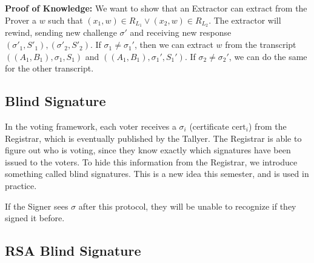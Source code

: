 \textbf{Proof of Knowledge:} We want to show that an Extractor can extract from the Prover a $w$ such that $(x_1, w) \in R_{L_1} \vee (x_2, w) \in R_{L_2}$. The extractor will rewind, sending new challenge $\sigma'$ and receiving new response $(\sigma'_1, S'_1), (\sigma'_2, S'_2)$. If $\sigma_1 \neq \sigma_1'$, then we can extract $w$ from the transcript $((A_1, B_1), \sigma_1, S_1)$ and $((A_1, B_1), \sigma_1', S_1')$. If $\sigma_2 \neq \sigma_2'$, we can do the same for the other transcript.

\subsection{Blind Signature}

In the voting framework, each voter receives a $\sigma_i$ (certificate $\text{cert}_i$) from the Registrar, which is eventually published by the Tallyer. The Registrar is able to figure out who is voting, since they know exactly which signatures have been issued to the voters. To hide this information from the Registrar, we introduce something called blind signatures. This is a new idea this semester, and is used in practice.


If the Signer sees $\sigma$ after this protocol, they will be unable to recognize if they signed it before.

\subsection{RSA Blind Signature}


